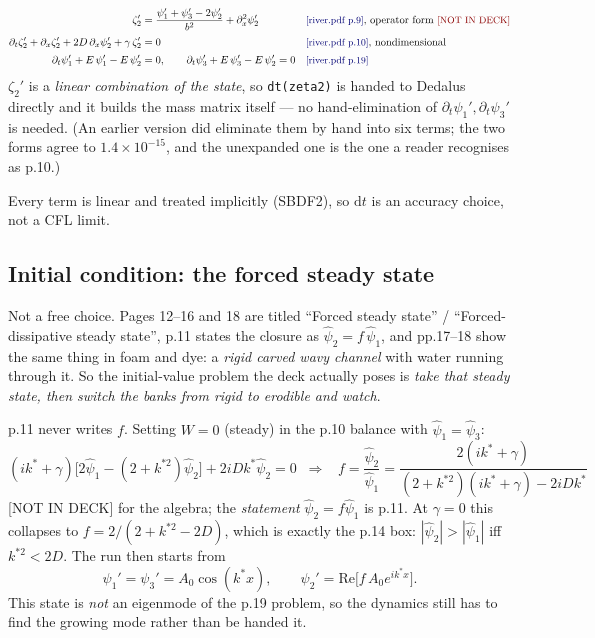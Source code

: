 \documentclass[11pt]{article}
\newcommand{\code}[1]{\texttt{\small #1}}
\newcommand{\deck}[1]{{\color{blue!45!black}\small[river.pdf p.#1]}}
\newcommand{\notdeck}{{\color{red!55!black}\small[NOT IN DECK]}}
\newcommand{\zt}{\zeta_2'}
\newcommand{\pt}{\psi_2'}
\newcommand{\po}{\psi_1'}
\newcommand{\ph}{\psi_3'}
\newcommand{\ks}{k^{*}}
\newcommand{\kss}{k^{*2}}   %
\newcommand{\dx}{\partial_x}
\newcommand{\dt}{\partial_t}
\begin{document}
\begin{align}
  \zt &= \frac{\po+\ph-2\pt}{b^{2}} + \dx^{2}\pt
  &&\text{\deck{9}, operator form \notdeck}\\[2pt]
  \dt\zt + \dx\zt + 2D\,\dx\pt + \gamma\,\zt &= 0
  &&\text{\deck{10}, nondimensional}\\[2pt]
  \dt\po + E\,\po - E\,\pt &= 0,\qquad
  \dt\ph + E\,\ph - E\,\pt = 0
  &&\text{\deck{19}}
\end{align}
$\zt$ is a \emph{linear combination of the state}, so \code{dt(zeta2)} is handed to
Dedalus directly and it builds the mass matrix itself --- no hand-elimination of
$\dt\po,\dt\ph$ is needed. (An earlier version did eliminate them by hand into six terms;
the two forms agree to $1.4\times10^{-15}$, and the unexpanded one is the one a reader
recognises as p.10.)

Every term is linear and treated implicitly (SBDF2), so $\mathrm dt$ is an accuracy
choice, not a CFL limit.

\subsection{Initial condition: the forced steady state}
\label{sec:ic}
Not a free choice. Pages 12--16 and 18 are titled ``Forced steady state'' /
``Forced-dissipative steady state'', p.11 states the closure as
$\hat\psi_2=f\,\hat\psi_1$, and pp.17--18 show the same thing in foam and dye: a
\emph{rigid carved wavy channel} with water running through it. So the initial-value
problem the deck actually poses is \emph{take that steady state, then switch the banks
from rigid to erodible and watch}.

p.11 never writes $f$. Setting $W=0$ (steady) in the p.10 balance with
$\hat\psi_1=\hat\psi_3$:
\begin{equation}
  (i\ks+\gamma)\bigl[2\hat\psi_1-(2+\kss)\hat\psi_2\bigr]+2iD\ks\hat\psi_2=0
  \;\;\Longrightarrow\;\;
  \boxed{\;f=\frac{\hat\psi_2}{\hat\psi_1}
  =\frac{2(i\ks+\gamma)}{(2+\kss)(i\ks+\gamma)-2iD\ks}\;}
  \label{eq:f}
\end{equation}
\notdeck{} for the algebra; the \emph{statement} $\hat\psi_2=f\hat\psi_1$ is p.11.
At $\gamma=0$ this collapses to $f=2/(2+\kss-2D)$, which is exactly the p.14 box:
$|\hat\psi_2|>|\hat\psi_1|$ iff $\kss<2D$. The run then starts from
\begin{equation}
  \po=\ph=A_0\cos(\ks x),\qquad
  \pt=\mathrm{Re}\bigl[f\,A_0e^{i\ks x}\bigr].
\end{equation}
This state is \emph{not} an eigenmode of the p.19 problem, so the dynamics still has to
find the growing mode rather than be handed it.
\end{document}
